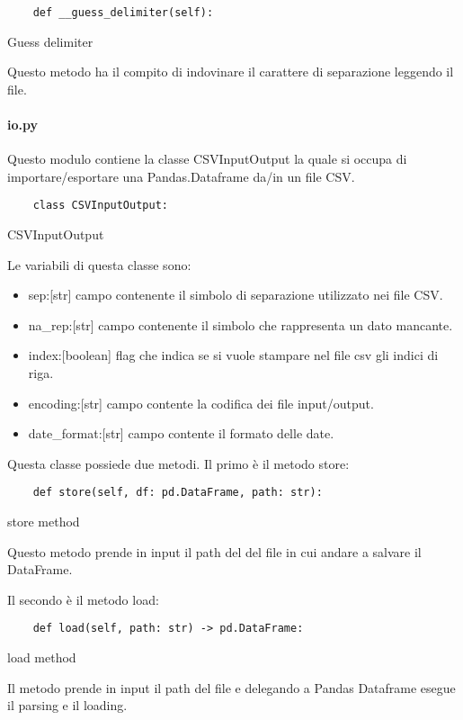 \begin{listing}[H]
\begin{verbatim}
    def __guess_delimiter(self):
\end{verbatim}
\caption{Guess delimiter}
\label{Code:2}
\end{listing}

Questo metodo ha il compito di indovinare il carattere di separazione leggendo il file.

\paragraph{io.py}
Questo modulo contiene la classe CSVInputOutput la quale si occupa di importare/esportare una Pandas.Dataframe da/in un file CSV.
\begin{listing}[H]
\begin{verbatim}
    class CSVInputOutput:
\end{verbatim}
\caption{CSVInputOutput}
\label{Code:3}
\end{listing}
Le variabili di questa classe sono:
\begin{itemize}[noitemsep]
    \item sep:[str] campo contenente il simbolo di separazione utilizzato nei file CSV.
    \item na{\_}rep:[str] campo contenente il simbolo che rappresenta un dato mancante. 
    \item index:[boolean] flag che indica se si vuole stampare nel file csv gli indici di riga.
    \item encoding:[str] campo contente la codifica dei file input/output.
    \item date{\_}format:[str] campo contente il formato delle date.
\end{itemize}
Questa classe possiede due metodi.
Il primo è il metodo store:
\begin{listing}[H]
\begin{verbatim}
    def store(self, df: pd.DataFrame, path: str):
\end{verbatim}
\caption{store method}
\label{Code:4}
\end{listing}
Questo metodo prende in input il path del del file in cui andare a salvare il DataFrame.

Il secondo è il metodo load:
\begin{listing}[H]
\begin{verbatim}
    def load(self, path: str) -> pd.DataFrame:
\end{verbatim}
\caption{load method}
\label{Code:5}
\end{listing}
Il metodo prende in input il path del file e delegando a Pandas Dataframe esegue il parsing e il loading.


